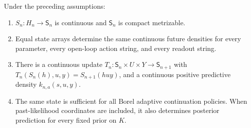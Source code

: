 \begin{theorem}\label{thm:continuous-state}
Under the preceding assumptions:
\begin{enumerate}
\item $S_n:H_n\to\mathsf S_n$ is continuous and $\mathsf S_n$ is compact metrizable.
\item Equal state arrays determine the same continuous future densities for every parameter, every open-loop action string, and every readout string.
\item There is a continuous update $T_n:\mathsf S_n\times U\times Y\to\mathsf S_{n+1}$ with $T_n(S_n(h),u,y)=S_{n+1}(huy)$, and a continuous positive predictive density $k_{n,a}(s,u,y)$.
\item The same state is sufficient for all Borel adaptive continuation policies. When past-likelihood coordinates are included, it also determines posterior prediction for every fixed prior on $K$.
\end{enumerate}
\end{theorem}
